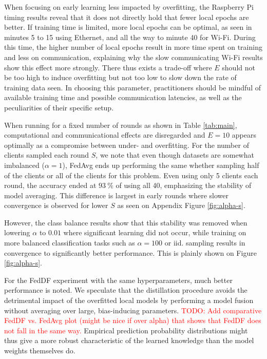 \documentclass{article}
\newcommand{\unit}[1]{\ensuremath{\:\text{#1}}}
\newcommand{\pro}{\ensuremath{\unit{\%{}}}}
\begin{document}
When focusing on early learning less impacted by overfitting, the Raspberry Pi timing results reveal that it does not directly hold that fewer local epochs are better.
If training time is limited, more local epochs can be optimal, as seen in minutes 5 to 15 using Ethernet, and all the way to minute 40 for Wi-Fi.
During this time, the higher number of local epochs result in more time spent on training and less on communication, explaining why the slow communicating Wi-Fi results show this effect more strongly.
There thus exists a trade-off where $E$ should not be too high to induce overfitting but not too low to slow down the rate of training data seen.
In choosing this parameter, practitioners should be mindful of available training time and possible communication latencies, as well as the peculiarities of their specific setup.

When running for a fixed number of rounds as shown in Table \ref{tab:main}, computational and communicational effects are disregarded and $E=10$ appears optimally as a compromise between under- and overfitting.
For the number of clients sampled each round $S$, we note that even though datasets are somewhat imbalanced ($\alpha=1$), FedAvg ends up performing the same whether sampling half of the clients or all of the clients for this problem.
Even using only 5 clients each round, the accuracy ended at $93 \pro$ of using all 40, emphasizing the stability of model averaging.
This difference is largest in early rounds where slower convergence is observed for lower $S$ as seen on Appendix Figure \ref{fig:alpha-s}.

However, the class balance results show that this stability was removed when lowering $\alpha$ to $0.01$ where significant learning did not occur, while training on more balanced classification tasks such as $\alpha=100$ or iid. sampling results in convergence to significantly better performance.
This is plainly shown on Figure \ref{fig:alpha-s}.

For the FedDF experiment with the same hyperparameters, much better performance is noted.
We speculate that the distillation procedure avoids the detrimental impact of the overfitted local models by performing a model fusion without averaging over large, bias-inducing parameters.
\textcolor{red}{
TODO: Add comparative FedDF vs. FedAvg plot (might be nice if over alpha) that shows that FedDF does not fall in the same way.
}
Empirical prediction probability distributions might thus give a more robust characteristic of the learned knowledge than the model weights themselves do.
\end{document}
